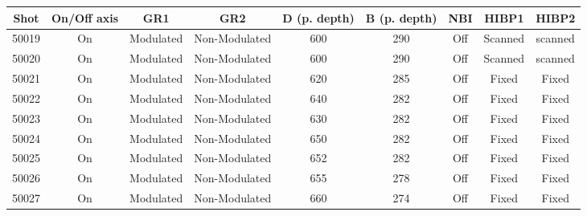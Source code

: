 \documentclass[preprint,12pt,authoryear]{elsarticle}
\begin{document}
\begin{center}
\begin{table}[!ht]
\scriptsize
    \begin{tabular}{|| c || c | c | c | c | c | c | c | c ||} 
        \hline
        Shot & On/Off axis & GR1 & GR2 & D (p. depth) &  B (p. depth) & NBI & HIBP1 & HIBP2  \\ [0.5ex] 
        \hline\hline
        50019 & On\cellcolor{MyYellow}& Modulated\cellcolor{Mygreen} & Non-Modulated\cellcolor{Myred} & 600 & 290 & Off\cellcolor{Myred} & Scanned\cellcolor{Mygreen} & scanned\cellcolor{Mygreen}\\
        \hline
        50020 & On\cellcolor{MyYellow}& Modulated\cellcolor{Mygreen} & Non-Modulated\cellcolor{Myred} & 600 & 290 & Off\cellcolor{Myred} & Scanned\cellcolor{Mygreen} & scanned\cellcolor{Mygreen}\\
        \hline
        50021 & On\cellcolor{MyYellow}& Modulated\cellcolor{Mygreen} & Non-Modulated\cellcolor{Myred} & 620 & 285 & Off\cellcolor{Myred} & Fixed\cellcolor{Myred} & Fixed\cellcolor{Myred}\\
        \hline
        50022 & On\cellcolor{MyYellow}& Modulated\cellcolor{Mygreen} & Non-Modulated\cellcolor{Myred} & 640 & 282 & Off\cellcolor{Myred} & Fixed\cellcolor{Myred} & Fixed\cellcolor{Myred}\\
        \hline
        50023 & On\cellcolor{MyYellow}& Modulated\cellcolor{Mygreen} & Non-Modulated\cellcolor{Myred} & 630 & 282 & Off\cellcolor{Myred} & Fixed\cellcolor{Myred} & Fixed\cellcolor{Myred}\\
        \hline
        50024 & On\cellcolor{MyYellow}& Modulated\cellcolor{Mygreen} & Non-Modulated\cellcolor{Myred} & 650 & 282 & Off\cellcolor{Myred} & Fixed\cellcolor{Myred} & Fixed\cellcolor{Myred}\\
        \hline
        50025 & On\cellcolor{MyYellow}& Modulated\cellcolor{Mygreen} & Non-Modulated\cellcolor{Myred} & 652 & 282 & Off\cellcolor{Myred} & Fixed\cellcolor{Myred} & Fixed\cellcolor{Myred}\\
        \hline
        50026 & On\cellcolor{MyYellow}& Modulated\cellcolor{Mygreen} & Non-Modulated\cellcolor{Myred} & 655 & 278 & Off\cellcolor{Myred} & Fixed\cellcolor{Myred} & Fixed\cellcolor{Myred}\\
        \hline
        50027 & On\cellcolor{MyYellow}& Modulated\cellcolor{Mygreen} & Non-Modulated\cellcolor{Myred} & 660 & 274 & Off\cellcolor{Myred} & Fixed\cellcolor{Myred} & Fixed\cellcolor{Myred}\\

\end{tabular}
\end{table}
\end{center}
\end{document}
